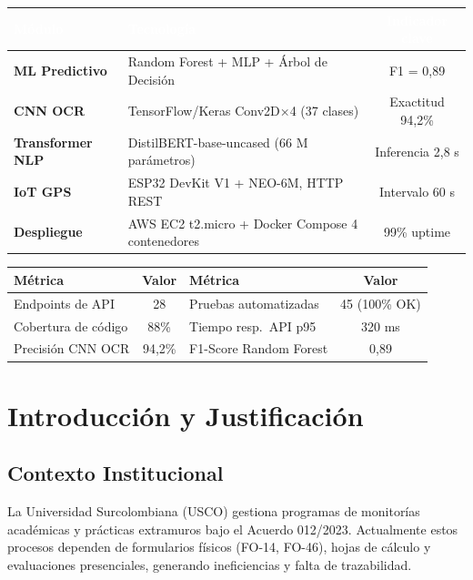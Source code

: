 \documentclass[12pt,a4paper,twoside]{report}
\begin{document}
\begin{center}
\begin{tabularx}{\textwidth}{|>{\bfseries}l|X|c|}
\hline
\rowcolor{tableHdr}\textcolor{white}{\textbf{Módulo}} &
\textcolor{white}{\textbf{Tecnología}} &
\textcolor{white}{\textbf{Indicador clave}} \\
\hline
\rowcolor{rowOdd}ML Predictivo & Random Forest + MLP + Árbol de Decisión & F1 = 0,89 \\
\hline
\rowcolor{rowEven}CNN OCR & TensorFlow/Keras Conv2D×4 (37 clases) & Exactitud 94,2\% \\
\hline
\rowcolor{rowOdd}Transformer NLP & DistilBERT-base-uncased (66 M parámetros) & Inferencia 2,8 s \\
\hline
\rowcolor{rowEven}IoT GPS & ESP32 DevKit V1 + NEO-6M, HTTP REST & Intervalo 60 s \\
\hline
\rowcolor{rowOdd}Despliegue & AWS EC2 t2.micro + Docker Compose 4 contenedores & 99\% uptime \\
\hline
\end{tabularx}
\end{center}

\begin{center}
\begin{tabular}{lclc}
\toprule
\textbf{Métrica} & \textbf{Valor} & \textbf{Métrica} & \textbf{Valor} \\
\midrule
Endpoints de API     & 28     & Pruebas automatizadas & 45 (100\% OK) \\
Cobertura de código  & 88\%   & Tiempo resp.\ API p95 & 320 ms \\
Precisión CNN OCR    & 94,2\% & F1-Score Random Forest & 0,89 \\
\bottomrule
\end{tabular}
\end{center}

\tableofcontents\newpage
\listoffigures\newpage
\listoftables\newpage

\chapter{Introducción y Justificación}

\section{Contexto Institucional}
La Universidad Surcolombiana (USCO) gestiona programas de monitorías académicas y prácticas
extramuros bajo el Acuerdo 012/2023. Actualmente estos procesos dependen de formularios físicos
(FO-14, FO-46), hojas de cálculo y evaluaciones presenciales, generando ineficiencias y falta de
trazabilidad.
\end{document}
